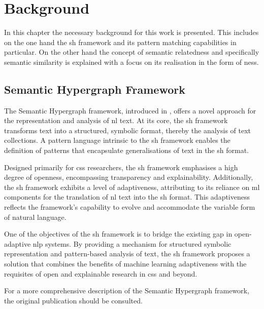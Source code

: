 \documentclass[11pt]{scrreprt}
\let\citef\cite  %
\let\cite\parencite  %
\begin{document}
\chapter{Background}
In this chapter the necessary background for this work is presented. This includes on the one hand the \gls{sh} framework and its pattern matching capabilities in particular. On the other hand the concept of semantic relatedness and specifically semantic similarity is explained with a focus on its realisation in the form of \gls{ness}.

\section{Semantic Hypergraph Framework}
\label{sec:semantic-hypergraph-framework}

The Semantic Hypergraph framework, introduced in \citef{menezesSemanticHypergraphs2021}, offers a novel approach for the representation and analysis of \gls{nl} text. At its core, the \gls{sh} framework transforms text into a structured, symbolic format, thereby the analysis of text collections. A pattern language intrinsic to the \gls{sh} framework enables the definition of patterns that encapsulate generalisations of text in the \gls{sh} format.

Designed primarily for \gls{css} researchers, the \gls{sh} framework emphasises a high degree of openness, encompassing transparency and explainability. Additionally, the \gls{sh} framework exhibits a level of adaptiveness, attributing to its reliance on \gls{ml} components for the translation of \gls{nl} text into the \gls{sh} format. This adaptiveness reflects the framework's capability to evolve and accommodate the variable form of natural language.

One of the objectives of the \gls{sh} framework is to bridge the existing gap in open-adaptive \gls{nlp} systems. By providing a mechanism for structured symbolic representation and pattern-based analysis of text, the \gls{sh} framework proposes a solution that combines the benefits of machine learning adaptiveness with the requisites of open and explainable research in \gls{css} and beyond.

For a more comprehensive description of the Semantic Hypergraph framework, the original publication \cite{menezesSemanticHypergraphs2021} should be consulted.
\end{document}
